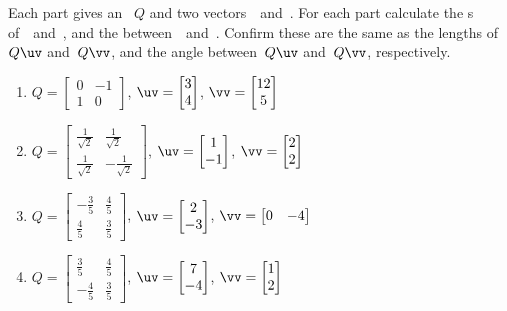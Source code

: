 \begin{exercise} \label{ex:preserve} 
Each part gives an ~\(Q\) and two vectors~\uv\ and~\vv.  
For each part calculate the s of~\uv\ and~\vv, and the  between~\uv\ and~\vv.
Confirm these are the same as the lengths of~\(Q\uv\) and~\(Q\vv\), and the angle between~\(Q\uv\) and~\(Q\vv\), respectively.

\begin{enumerate}
\item \(Q=\begin{bmatrix} 0&-1\\1&0 \end{bmatrix}\), 
\(\uv=\begin{bmatrix} 3\\4 \end{bmatrix}\),
\(\vv=\begin{bmatrix} 12\\5 \end{bmatrix}\)

\item \(Q=\begin{bmatrix} \frac1{\sqrt2}&\frac1{\sqrt2}
\\\frac1{\sqrt2}&-\frac1{\sqrt2} \end{bmatrix}\), 
\(\uv=\begin{bmatrix} 1\\-1 \end{bmatrix}\),
\(\vv=\begin{bmatrix} 2\\2 \end{bmatrix}\)

\item \(Q=\begin{bmatrix} -\frac35&\frac45
\\\frac45&\frac35 \end{bmatrix}\), 
\(\uv=\begin{bmatrix} 2\\-3 \end{bmatrix}\),
\(\vv=\begin{bmatrix} 0&-4 \end{bmatrix}\)

\item \(Q=\begin{bmatrix} \frac35&\frac45
\\-\frac45&\frac35 \end{bmatrix}\), 
\(\uv=\begin{bmatrix} 7\\-4 \end{bmatrix}\),
\(\vv=\begin{bmatrix} 1\\2 \end{bmatrix}\)


\end{enumerate}
\end{exercise}
